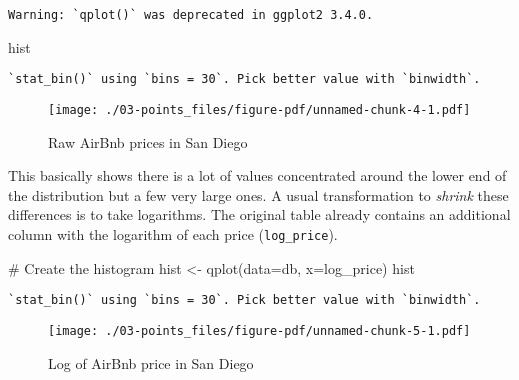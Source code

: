 \documentclass[
  letterpaper,
  krantz2]{style/krantz}
\newenvironment{Shaded}{\begin{snugshade}}{\end{snugshade}}
\newcommand{\AttributeTok}[1]{\textcolor[rgb]{0.40,0.45,0.13}{#1}}
\newcommand{\CommentTok}[1]{\textcolor[rgb]{0.37,0.37,0.37}{#1}}
\newcommand{\FunctionTok}[1]{\textcolor[rgb]{0.28,0.35,0.67}{#1}}
\newcommand{\NormalTok}[1]{\textcolor[rgb]{0.00,0.23,0.31}{#1}}
\newcommand{\OtherTok}[1]{\textcolor[rgb]{0.00,0.23,0.31}{#1}}
\begin{document}
\begin{verbatim}
Warning: `qplot()` was deprecated in ggplot2 3.4.0.
\end{verbatim}

\begin{Shaded}
\begin{Highlighting}[]
\NormalTok{hist}
\end{Highlighting}
\end{Shaded}

\begin{verbatim}
`stat_bin()` using `bins = 30`. Pick better value with `binwidth`.
\end{verbatim}

\begin{figure}[H]

{\centering \texttt{[image: ./03-points\_files/figure-pdf/unnamed-chunk-4-1.pdf]}

}

\caption{Raw AirBnb prices in San Diego}

\end{figure}

This basically shows there is a lot of values concentrated around the
lower end of the distribution but a few very large ones. A usual
transformation to \emph{shrink} these differences is to take logarithms.
The original table already contains an additional column with the
logarithm of each price (\texttt{log\_price}).

\begin{Shaded}
\begin{Highlighting}[]
\CommentTok{\# Create the histogram}
\NormalTok{hist }\OtherTok{\textless{}{-}} \FunctionTok{qplot}\NormalTok{(}\AttributeTok{data=}\NormalTok{db, }\AttributeTok{x=}\NormalTok{log\_price)}
\NormalTok{hist}
\end{Highlighting}
\end{Shaded}

\begin{verbatim}
`stat_bin()` using `bins = 30`. Pick better value with `binwidth`.
\end{verbatim}

\begin{figure}[H]

{\centering \texttt{[image: ./03-points\_files/figure-pdf/unnamed-chunk-5-1.pdf]}

}

\caption{Log of AirBnb price in San Diego}

\end{figure}
\end{document}
